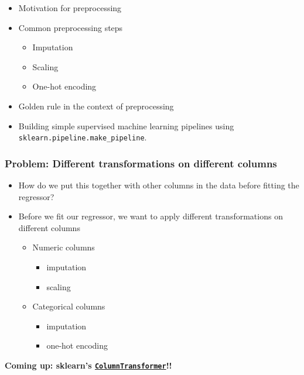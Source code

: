 \documentclass[11pt]{article}
\providecommand{\tightlist}{%
      \setlength{\itemsep}{0pt}\setlength{\parskip}{0pt}}
\begin{document}
\begin{itemize}
\tightlist
\item
  Motivation for preprocessing
\item
  Common preprocessing steps

  \begin{itemize}
  \tightlist
  \item
    Imputation
  \item
    Scaling
  \item
    One-hot encoding
  \end{itemize}
\item
  Golden rule in the context of preprocessing
\item
  Building simple supervised machine learning pipelines using
  \texttt{sklearn.pipeline.make\_pipeline}.
\end{itemize}

    \subsubsection{Problem: Different transformations on different
columns}\label{problem-different-transformations-on-different-columns}

\begin{itemize}
\tightlist
\item
  How do we put this together with other columns in the data before
  fitting the regressor?
\item
  Before we fit our regressor, we want to apply different
  transformations on different columns

  \begin{itemize}
  \tightlist
  \item
    Numeric columns

    \begin{itemize}
    \tightlist
    \item
      imputation
    \item
      scaling\\
    \end{itemize}
  \item
    Categorical columns

    \begin{itemize}
    \tightlist
    \item
      imputation
    \item
      one-hot encoding
    \end{itemize}
  \end{itemize}
\end{itemize}

    \textbf{Coming up: sklearn's
\href{https://scikit-learn.org/stable/modules/generated/sklearn.compose.ColumnTransformer.html}{\texttt{ColumnTransformer}}!!}


    
    
    
\end{document}
